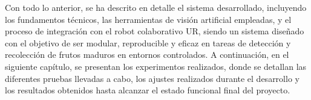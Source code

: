 Con todo lo anterior, se ha descrito en detalle el sistema desarrollado, incluyendo los fundamentos técnicos, las herramientas de visión artificial empleadas, y el proceso de integración con el robot colaborativo UR, siendo un sistema diseñado con el objetivo de ser modular, reproducible y eficaz en tareas de detección y recolección de frutos maduros en entornos controlados. A continuación, en el siguiente capítulo, se presentan los experimentos realizados, donde se detallan las diferentes pruebas llevadas a cabo, los ajustes realizados durante el desarrollo y los resultados obtenidos hasta alcanzar el estado funcional final del proyecto.

















